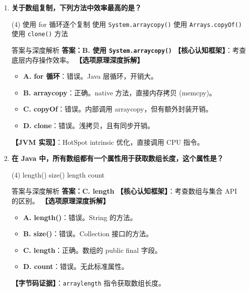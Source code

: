 \documentclass[12pt, a4paper]{ctexart}
\newcommand{\code}[1]{\texttt{#1}}
\begin{document}
\begin{enumerate}[label=\textbf{\arabic*.}, itemsep=1em]
    \item \textbf{关于数组复制，下列方法中效率最高的是？}
    \begin{tasks}(4)
        \task 使用 for 循环逐个复制 \task 使用 \code{System.arraycopy()}
        \task 使用 \code{Arrays.copyOf()} \task 使用 \code{clone()} 方法
    \end{tasks}
    \begin{bluebox}{答案与深度解析}
    \textbf{答案：B. 使用 \code{System.arraycopy()}}
    \textbf{【核心认知框架】}：考查底层内存操作效率。
    \textbf{【选项原理深度拆解】}
    \begin{itemize}[leftmargin=*, nosep]
        \item \textbf{A. for 循环}：错误。Java 层循环，开销大。
        \item \textbf{B. arraycopy}：正确。native 方法，直接内存拷贝 (memcpy)。
        \item \textbf{C. copyOf}：错误。内部调用 arraycopy，但有额外封装开销。
        \item \textbf{D. clone}：错误。浅拷贝，且有同步开销。
    \end{itemize}
    \textbf{【JVM 实现】}：HotSpot  intrinsic 优化，直接调用 CPU 指令。
    \end{bluebox}

    \item \textbf{在 Java 中，所有数组都有一个属性用于获取数组长度，这个属性是？}
    \begin{tasks}(4)
        \task length() \task size() \task length \task count
    \end{tasks}
    \begin{bluebox}{答案与深度解析}
    \textbf{答案：C. length}
    \textbf{【核心认知框架】}：考查数组与集合 API 的区别。
    \textbf{【选项原理深度拆解】}
    \begin{itemize}[leftmargin=*, nosep]
        \item \textbf{A. length()}：错误。String 的方法。
        \item \textbf{B. size()}：错误。Collection 接口的方法。
        \item \textbf{C. length}：正确。数组的 public final 字段。
        \item \textbf{D. count}：错误。无此标准属性。
    \end{itemize}
    \textbf{【字节码证据】}：\code{arraylength} 指令获取数组长度。
    \end{bluebox}


\end{enumerate}
\end{document}
